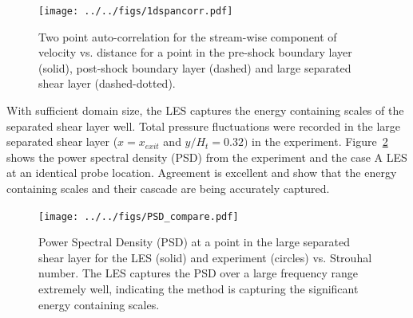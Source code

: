 \documentclass[]{aiaa-tc}%
\begin{document}




\begin{figure}[!ht]
	\centering
	\texttt{[image: ../../figs/1dspancorr.pdf]}
	\caption{ Two point auto-correlation for the stream-wise component of velocity vs. distance for a point in the pre-shock boundary layer (solid), post-shock boundary layer (dashed) and large separated shear layer (dashed-dotted).  
 	\label{fig:span_corr}
	}
\end{figure}



With sufficient domain size, the LES captures the energy containing scales of the separated shear layer well.  Total pressure fluctuations were recorded in the large separated shear layer ($x=x_{exit}$ and $y/H_t = 0.32)$ in the experiment.  Figure~\ref{fig:PSD_comp} shows the power spectral density (PSD) from the experiment and the case A LES at an identical probe location.  Agreement is excellent and show that the energy containing scales and their cascade are being accurately captured.  


\begin{figure}
	\centering
	\texttt{[image: ../../figs/PSD\_compare.pdf]}
	\caption{ Power Spectral Density (PSD) at a point in the large separated shear layer for the LES (solid) and experiment (circles) vs. Strouhal number.  The LES captures the PSD over a large frequency range extremely well, indicating the method is capturing the significant energy containing scales.
 	\label{fig:PSD_comp}
	}
\end{figure}
\end{document}
